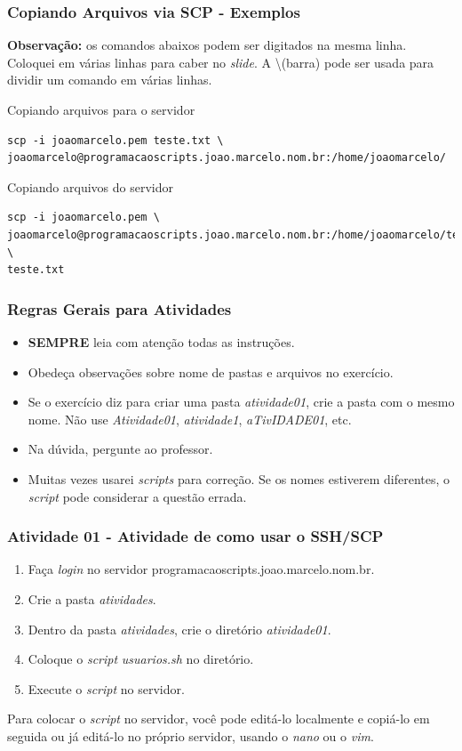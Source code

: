 \documentclass{beamer}
\begin{document}
\begin{frame}[fragile]
   \frametitle{Copiando Arquivos via SCP - Exemplos}
   \small
   \textbf{Observação:} os comandos abaixos podem ser digitados na mesma linha. Coloquei em várias linhas para caber no \textit{slide}. A \textbackslash (barra)  pode ser usada para dividir um comando em várias linhas.
   \normalsize
   \begin{block}{Copiando arquivos para o servidor}
   \scriptsize
   \begin{verbatim}
scp -i joaomarcelo.pem teste.txt \
joaomarcelo@programacaoscripts.joao.marcelo.nom.br:/home/joaomarcelo/
   \end{verbatim}
   \end{block}
   \normalsize
   \begin{block}{Copiando arquivos do servidor}
   \scriptsize
   \begin{verbatim}
scp -i joaomarcelo.pem \
joaomarcelo@programacaoscripts.joao.marcelo.nom.br:/home/joaomarcelo/teste.txt \
teste.txt
   \end{verbatim}
   \end{block}
\end{frame}

\begin{frame}
   \frametitle{Regras Gerais para Atividades}
   \begin{itemize}
      \item \textbf{SEMPRE} leia com atenção todas as instruções.
      \item Obedeça observações sobre nome de pastas e arquivos no exercício.
      \item Se o exercício diz para criar uma pasta \textit{atividade01}, crie a pasta com o mesmo nome. Não use \textit{Atividade01}, \textit{atividade1}, \textit{aTivIDADE01}, etc.
      \item Na dúvida, pergunte ao professor.
      \item Muitas vezes usarei \textit{scripts} para correção. Se os nomes estiverem diferentes, o \textit{script} pode considerar a questão errada.
   \end{itemize}
\end{frame}

\begin{frame}
   \frametitle{Atividade 01 - Atividade de como usar o SSH/SCP}
   \begin{enumerate}
      \item Faça \textit{login} no servidor programacaoscripts.joao.marcelo.nom.br.
      \item Crie a pasta \textit{atividades}.
      \item Dentro da pasta \textit{atividades}, crie o diretório \textit{atividade01}.
      \item Coloque o \textit{script} \textit{usuarios.sh} no diretório.
      \item Execute o \textit{script} no servidor.
   \end{enumerate}
   Para colocar o \textit{script} no servidor, você pode editá-lo localmente e copiá-lo em seguida ou já editá-lo no próprio servidor, usando o \textit{nano} ou o \textit{vim}.
\end{frame}
\end{document}
